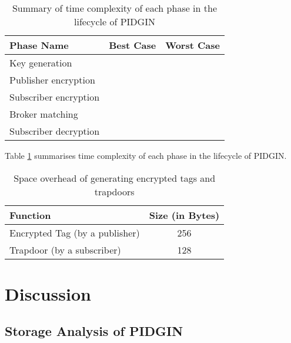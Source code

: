 \documentclass[epsfig,a4paper,11pt,titlepage]{book}
\numberwithin{algorithm}{chapter}
\begin{document}
\begin{table} [htp]
\centering
\caption[Time complexity of each phase in the lifecycle of PIDGIN]{Summary of time complexity of each phase in the lifecycle of \gls{PIDGIN}}
\label{tab:pidgin-complexity-summary}
\begin{tabular}{ |l|c|c| } 

\hline

\textbf{Phase Name} & \textbf{Best Case} & \textbf{Worst Case} \\ \hline

Key generation & \multicolumn{2}{c|}{} \\ \hline

Publisher encryption & \multicolumn{2}{c|}{} \\ \hline

Subscriber encryption & \multicolumn{2}{c|}{} \\ \hline

Broker matching &  &  \\ \hline

Subscriber decryption &  &  \\ \hline

\end{tabular}
\end{table}

Table \ref{tab:pidgin-complexity-summary} summarises time complexity of each phase in the lifecycle of \gls{PIDGIN}.

\begin{table} [htp]
\centering
\caption{Space overhead of generating encrypted tags and trapdoors}
\label{tab:pidgin-storage}
\begin{tabular}{ |l|c| }
\hline
\textbf{Function} & \textbf{Size (in Bytes)} \\ \hline
Encrypted Tag (by a publisher) & 256 \\ \hline
Trapdoor (by a subscriber) & 128 \\ \hline
\end{tabular}
\end{table}

\section{Discussion}
\label{sec:pidgin-discussion}



\subsection[Storage Analysis of PIDGIN]{Storage Analysis of \gls{PIDGIN}}
\end{document}
